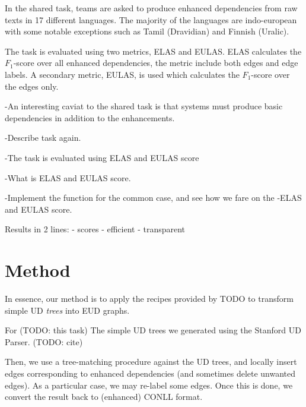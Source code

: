 \documentclass[11pt,a4paper]{article}
\begin{document}
In the shared task, teams are asked to produce enhanced
dependencies from raw texts in 17 different languages. The
majority of the languages are indo-european with some notable
exceptions such as Tamil (Dravidian) and Finnish (Uralic).

The task is evaluated using two metrics, ELAS and EULAS. ELAS
calculates the $F_1$-score over all enhanced dependencies, the
metric include both edges and edge labels. A secondary metric,
EULAS, is used which calculates the $F_1$-score over the edges
only.


    
-An interesting caviat to the shared task is that systems must produce basic dependencies in addition to the enhancements.  
    
-Describe task again.

-The task is evaluated using ELAS and EULAS score

    
-What is ELAS and EULAS  score.

-Implement the function for the common case, and see how we fare on the
-ELAS and EULAS  score.

Results in 2 lines:
- scores
- efficient
- transparent

\section{Method}


In essence, our method is to apply the recipes provided by TODO to
transform simple UD \emph{trees} into EUD graphs.

For (TODO: this task) The simple UD trees we generated using the
Stanford UD Parser. (TODO: cite)

Then, we use a tree-matching procedure against the UD trees, and
locally insert edges corresponding to enhanced dependencies (and
sometimes delete unwanted edges). As a particular case, we may
re-label some edges. Once this is done, we convert the result back to
(enhanced) CONLL  format.
\end{document}
